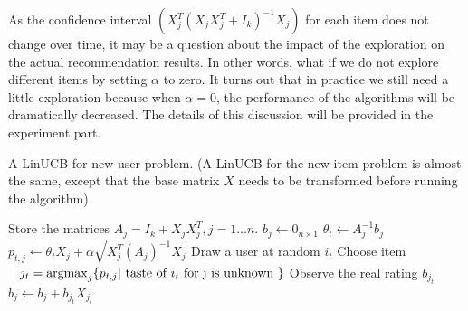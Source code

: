 \documentclass[twoside,leqno,twocolumn]{article}
\newcommand{\jm}[1]{{\color{TealBlue}(jm) #1\color{black}}}
\newcommand{\hai}[1]{\color{blue}(hai) #1\color{black}}
\begin{document}
As the confidence interval $(X^{T}_{j}(X_{j}X^{T}_{j}+I_{k})^{-1}X_{j})$ for each item does not change over time, it may be a question about the impact of the exploration on the actual recommendation results. In other words, what if we do not explore different items by setting $\alpha$ to zero. It turns out that in practice we still need a little exploration because when $\alpha=0$, the performance of the algorithms will be dramatically decreased. The details of this discussion will be provided in the experiment part. 

\begin{algorithm}
	\label{AlinUCB}
  \caption{A-LinUCB for new user problem. (A-LinUCB for the new item problem is almost the same, except that the base matrix $X$ needs to be transformed before running the algorithm)} %
  \begin{algorithmic}[1]
    \State Store the matrices $A_{j} = I_{k}+X_{j}X^{T}_{j},j=1\ldots n.$
	  \State $b_{j} \gets 0_{n\times 1}$	
	\EndIf
	\State $\theta_{t}\gets{}A^{-1}_{j}b_{j}$
	\State $p_{t,j} \gets \theta_{t}X_{j}+\alpha\sqrt{X^{T}_{j}(A_{j})^{-1}X_{j}}$
      \EndFor
	  \State Draw a user at random $i_t$ 
      \State Choose item \\ ~ $j_{t}= \operatorname*{argmax}_{j}\{p_{t,j} | \mbox{ taste of  $i_t$ for  j is unknown } \}$ 
      \State Observe the real rating $b_{j_{t}}$
	  \State $b_{j} \gets b_{j}+b_{j_{t}}X_{j_{t}}$	  	
    \EndFor
  \EndProcedure
  \end{algorithmic}
  \label{algo:LinUCB-for-new-user-item-pb}
\end{algorithm}
\end{document}
